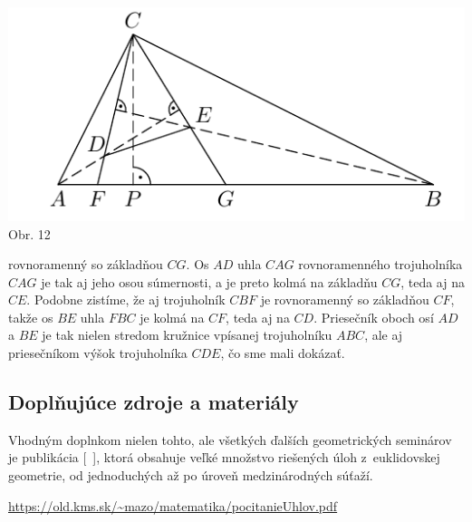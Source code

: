 \begin{center}
\includegraphics{obrazky/58K22}\\

Obr. 12
\end{center}
rovnoramenný so základňou $CG$. Os $AD$ uhla $CAG$ rovnoramenného trojuholníka $CAG$ je tak aj jeho osou súmernosti, a je preto kolmá na základňu $CG$, teda aj na $CE$. Podobne zistíme, že aj trojuholník $CBF$ je rovnoramenný so základňou $CF$, takže os $BE$ uhla $FBC$ je kolmá na $CF$, teda aj na $CD$. Priesečník oboch osí $AD$ a $BE$ je tak nielen stredom kružnice vpísanej trojuholníku $ABC$, ale aj priesečníkom výšok trojuholníka $CDE$, čo sme mali dokázať.

\subsection*{Doplňujúce zdroje a materiály}
Vhodným doplnkom nielen tohto, ale všetkých ďalších geometrických seminárov je publikácia [~\cite{andreescu2013}], ktorá obsahuje veľké množstvo riešených úloh z~euklidovskej geometrie, od jednoduchých až po úroveň medzinárodných súťaží.

\url{https://old.kms.sk/~mazo/matematika/pocitanieUhlov.pdf}


